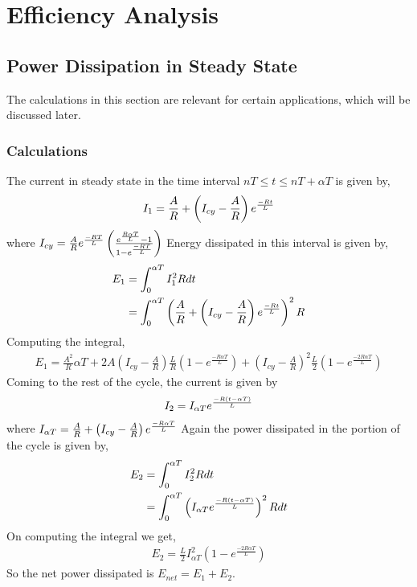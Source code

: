 
\chapter{Efficiency Analysis}

\label{Chapter6}

\section{Power Dissipation in Steady State}
    The calculations in this section are relevant for certain applications, which will be discussed later.
\subsection{Calculations}
    The current in steady state in the time interval $nT \le t \le nT + \alpha T$ is given by, 
    \begin{align*}
               I_{1} = \frac{A}{R} + \left(I_{cy} - \frac{A}{R}\right)e^{\frac{-Rt}{L}}
    \end{align*}
    where $I_{cy} =\frac{A}{R}e^{\frac{-RT}{L}}\left(\frac{e^{\frac{R\alpha T}{L}} - 1}{1-e^{\frac{-RT}{L}}}\right)
 $
    Energy dissipated in this interval is given by, 
    \begin{align*}
        E_1 &= \int_{0}^{\alpha T} I_1^2R dt\\
        &= \int_0^{\alpha T}\left(\frac{A}{R} + \left(I_{cy} - \frac{A}{R}\right)e^{\frac{-Rt}{L}}\right)^2 R\\
    \end{align*}
    Computing the integral, 
    \begin{align*}
        E_1 = \frac{A^2}{R} \alpha T + 2A \left(I_{cy} - \frac{A}{R}\right) \frac{L}{R} \left(1 - e^{\frac{-R\alpha T}{L}}\right) + \left(I_{cy} - \frac{A}{R}\right)^2 \frac{L}{2} \left(1 - e^{\frac{-2R\alpha T}{L}}\right)
    \end{align*}
    Coming to the rest of the cycle, the current is given by
    \begin{align*}
        I_{2} = I_{\alpha T}e^{\frac{-R\left(t-\alpha T\right)}{L}}\\
    \end{align*}
    where $I_{\alpha T} =  \frac{A}{R} + \left(I_{cy} - \frac{A}{R}\right)e^{\frac{-R\alpha T}{L}}
 $
 Again the power dissipated in the portion of the cycle is given by, 
 \begin{align*}
    E_2 &= \int_{0}^{\alpha T} I_2^2R dt\\
    &= \int_{0}^{\alpha T} \left(I_{\alpha T}e^{\frac{-R\left(t-\alpha T\right)}{L}}\right)^2R dt\\
 \end{align*}
 On computing the integral we get, 
 \begin{align*}
     E_2 = \frac{L}{2} I_{\alpha T}^2 \left(1 - e^{\frac{-2R\alpha T}{L}}\right)
 \end{align*}
 So the net power dissipated is $E_{net} = E_1 + E_2$.
